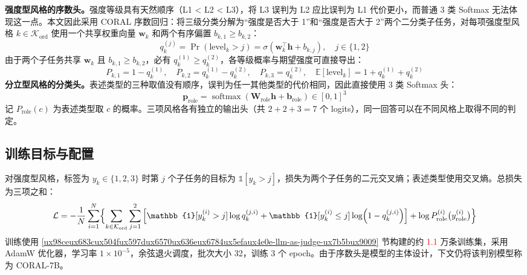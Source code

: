 \documentclass[fontset=fandol,type=master,campus=shenzhen,etitleauto=true]{hithesisbook}
\newcommand{\rev}[1]{\textcolor{red}{#1}}
\begin{document}
\textbf{强度型风格的序数头。}强度等级具有天然顺序（L1 < L2 < L3），将 L3 误判为 L2 应比误判为 L1 代价更小，而普通 3 类 Softmax 无法体现这一点。本文因此采用 CORAL 序数回归\cite{ref86}：将三级分类分解为“强度是否大于 1”和“强度是否大于 2”两个二分类子任务，对每项强度型风格 $k \in \mathcal{K}_{\text{ord}}$ 使用一个共享权重向量 $\mathbf{w}_k$ 和两个有序偏置 $b_{k,1} \ge b_{k,2}$：
\begin{equation}
q_k^{(j)} = \Pr(\text{level}_k > j) = \sigma\!\left(\mathbf{w}_k^{\top}\mathbf{h} + b_{k,j}\right), \quad j \in \{1, 2\}
\end{equation}
由于两个子任务共享 $\mathbf{w}_k$ 且 $b_{k,1} \ge b_{k,2}$，必有 $q_k^{(1)} \ge q_k^{(2)}$，各等级概率与期望强度可直接导出：
\begin{equation}
P_{k,1} = 1 - q_k^{(1)}, \quad P_{k,2} = q_k^{(1)} - q_k^{(2)}, \quad P_{k,3} = q_k^{(2)}, \quad \mathbb{E}[\text{level}_k] = 1 + q_k^{(1)} + q_k^{(2)}
\end{equation}
\textbf{分立型风格的分类头。}表述类型的三种取值没有顺序，误判为任一其他类型的代价相同，因此直接使用 3 类 Softmax 头：
\begin{equation}
\mathbf{p}_{\text{role}} = \operatorname{softmax}\!\left(\mathbf{W}_{\text{role}}\mathbf{h} + \mathbf{b}_{\text{role}}\right) \in [0,1]^{3}
\end{equation}
记 $P_{\text{role}}(c)$ 为表述类型取 $c$ 的概率。三项风格各有独立的输出头（共 $2 + 2 + 3 = 7$ 个 logits），同一回答可以在不同风格上取得不同的判定。

\subsection{训练目标与配置}\label{ux8badux7ec3ux76eeux6807ux4e0eux4f18ux5316ux914dux7f6e-1}

对强度型风格，标签为 $y_k \in \{1,2,3\}$ 时第 $j$ 个子任务的目标为 $\mathbb{1}[y_k > j]$，损失为两个子任务的二元交叉熵；表述类型使用交叉熵。总损失为三项之和：
\begin{equation}
\mathcal{L} = -\frac{1}{N}\sum_{i=1}^{N} \Bigl\{ \sum_{k \in \mathcal{K}_{\text{ord}}} \sum_{j=1}^{2} \left[ \mathbb{1}[y_k^{(i)} > j] \log q_k^{(j,i)} + \mathbb{1}[y_k^{(i)} \le j] \log\!\left(1 - q_k^{(j,i)}\right) \right] + \log P^{(i)}_{\text{role}}\bigl(y^{(i)}_{\text{role}}\bigr) \Bigr\}
\end{equation}
训练使用 \ref{ux98ceux683cux504fux597dux6570ux636eux6784ux5efaux4e0e-llm-as-judge-ux7b5bux9009} 节构建的约 \rev{1.1} 万条训练集，采用 AdamW 优化器，学习率 $1 \times 10^{-5}$，余弦退火调度，批次大小 32，训练 3 个 epoch。由于序数头是模型的主体设计，下文仍将该判别模型称为 CORAL-7B。
\end{document}
